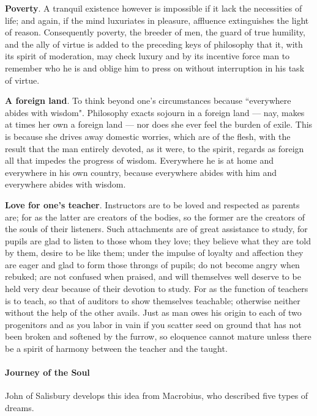 \textbf{Poverty}. A tranquil existence however is impossible if it lack the necessities of life; and again, if the mind luxuriates in pleasure, affluence extinguishes the light of reason. Consequently poverty, the breeder of men, the guard of true humility, and the ally of virtue is added to the preceding keys of philosophy that it, with its spirit of moderation, may check luxury and by its incentive force man to remember who he is and oblige him to press on without interruption in his task of virtue.

\textbf{A foreign land}. To think beyond one's circumstances because ``everywhere abides with wisdom". Philosophy exacts sojourn in a foreign land — nay, makes at times her own a foreign land — nor does she ever feel the burden of exile. This is because she drives away domestic worries, which are of the flesh, with the result that the man entirely devoted, as it were, to the spirit, regards as foreign all that impedes the progress of wisdom. Everywhere he is at home and everywhere in his own country, because everywhere abides with him and everywhere abides with wisdom.

\textbf{Love for one's teacher}. Instructors are to be loved and respected as parents are; for as the latter are creators of the bodies, so the former are the creators of the souls of their listeners. Such attachments are of great assistance to study, for pupils are glad to listen to those whom they love; they believe what they are told by them, desire to be like them; under the impulse of loyalty and affection they are eager and glad to form those throngs of pupils; do not become angry when rebuked; are not confused when praised, and will themselves well deserve to be held very dear because of their devotion to study. For as the function of teachers is to teach, so that of auditors to show themselves teachable; otherwise neither without the help of the other avails. Just as man owes his origin to each of two progenitors and as you labor in vain if you scatter seed on ground that has not been broken and softened by the furrow, so eloquence cannot mature unless there be a spirit of harmony between the teacher and the taught.

\paragraph{Journey of the Soul}
John of Salisbury develops this idea from Macrobius, who described five types of dreams.

